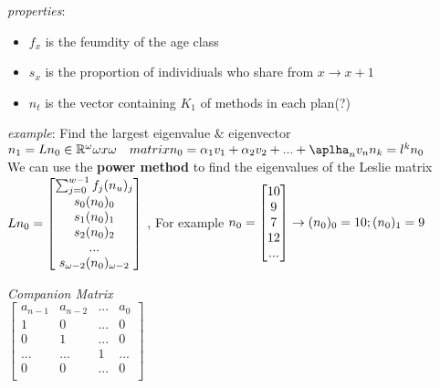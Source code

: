 \documentclass[10pt, AMS Euler]{article}
\newcommand{\R}{\mathbb{R}}
\begin{document}
\textit{properties}:
\begin{itemize}
  \item $f_x$ is the feumdity of the age class
  \item $s_x$ is the proportion of individiuals who share from $x \to x+1$
  \item $n_t$ is the vector containing $K_1$ of methods in each plan(?)
\end{itemize}

\textit{example}: Find the largest eigenvalue \& eigenvector\\
$
n_1 = L n_0 \in \R^\omega\\
\omega x \omega \quad matrix\\
n_0 = \alpha_1 v_1 + \alpha_2 v_2 + ... + \aplha_n v_n\\
n_k = l^k n_0\\
$\\

We can use the \textbf{power method} to find the eigenvalues of the Leslie matrix\\
$
Ln_0 = 
\begin{bmatrix}
  \sum_{j=0}^{w-1} f_j \* (n_u)_j \\
  s_0 (n_0)_0\\
  s_1 (n_0)_1\\
  s_2 (n_0)_2\\
  ...\\
  s_{\omega - 2} (n_0)_{\omega - 2}\\
\end{bmatrix}
$
, For example
$
n_0 =
\begin{bmatrix}
  10\\
  9\\
  7\\
  12\\
  ...\\
\end{bmatrix}
\rightarrow (n_0)_0 = 10; (n_0)_1 = 9\\
$

\textit{Companion Matrix}\\

$
\begin{bmatrix}
  a_{n-1} & a_{n-2} & ... & a_0\\
  1 & 0 & ... & 0\\
  0 & 1 & ... & 0\\
  ... & ... & 1 & ...\\
  0 & 0 & ... & 0\\
\end{bmatrix}
$
\end{document}

